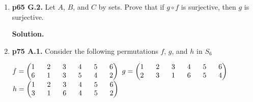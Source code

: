\documentclass[11pt]{article}
\begin{document}
\begin{enumerate}
\item {\bfseries p65 G.2.} Let $A$, $B$, and $C$ by sets. Prove that if $g \circ f$ is surjective, then $g$ is surjective.
  
	{\bfseries Solution.}
  
\newpage

\item {\bfseries p75 A.1.} Consider the following permutations $f$, $g$, and $h$ in $S_6$

	$f = \begin{pmatrix}
		1 \hspace{6mm} 2 \hspace{6mm} 3 \hspace{6mm} 4 \hspace{6mm} 5 \hspace{6mm} 6 \\
		6 \hspace{6mm} 1 \hspace{6mm} 3 \hspace{6mm} 5 \hspace{6mm} 4 \hspace{6mm} 2
	\end{pmatrix}$
	$g = \begin{pmatrix}
		1 \hspace{6mm} 2 \hspace{6mm} 3 \hspace{6mm} 4 \hspace{6mm} 5 \hspace{6mm} 6 \\
		2 \hspace{6mm} 3 \hspace{6mm} 1 \hspace{6mm} 6 \hspace{6mm} 5 \hspace{6mm} 4
	\end{pmatrix}$ \\
	$h = \begin{pmatrix}
		1 \hspace{6mm} 2 \hspace{6mm} 3 \hspace{6mm} 4 \hspace{6mm} 5 \hspace{6mm} 6 \\
		3 \hspace{6mm} 1 \hspace{6mm} 6 \hspace{6mm} 4 \hspace{6mm} 5 \hspace{6mm} 2
	\end{pmatrix}$
  

\end{enumerate}
\end{document}
